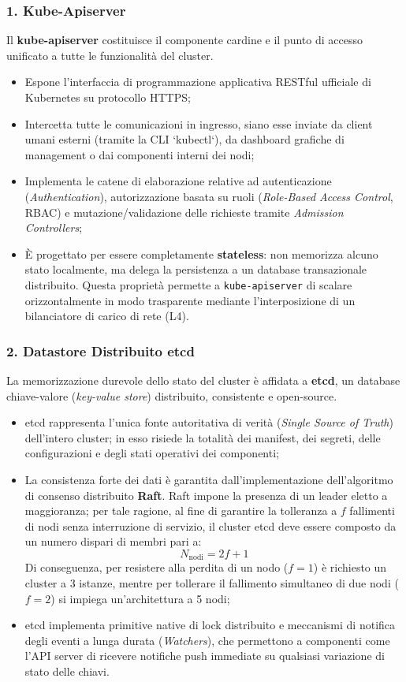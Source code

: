 \documentclass[11pt, a4paper]{article}
\begin{document}
\subsubsection{1. Kube-Apiserver}
Il \textbf{kube-apiserver} costituisce il componente cardine e il punto di accesso unificato a tutte le funzionalità del cluster.
\begin{itemize}[noitemsep]
    \item Espone l'interfaccia di programmazione applicativa RESTful ufficiale di Kubernetes su protocollo HTTPS;
    \item Intercetta tutte le comunicazioni in ingresso, siano esse inviate da client umani esterni (tramite la CLI `kubectl`), da dashboard grafiche di management o dai componenti interni dei nodi;
    \item Implementa le catene di elaborazione relative ad autenticazione (\emph{Authentication}), autorizzazione basata su ruoli (\emph{Role-Based Access Control}, RBAC) e mutazione/validazione delle richieste tramite \emph{Admission Controllers};
    \item È progettato per essere completamente \textbf{stateless}: non memorizza alcuno stato localmente, ma delega la persistenza a un database transazionale distribuito. Questa proprietà permette a \texttt{kube-apiserver} di scalare orizzontalmente in modo trasparente mediante l'interposizione di un bilanciatore di carico di rete (L4).
\end{itemize}

\subsubsection{2. Datastore Distribuito etcd}
La memorizzazione durevole dello stato del cluster è affidata a \textbf{etcd}, un database chiave-valore (\emph{key-value store}) distribuito, consistente e open-source.
\begin{itemize}[noitemsep]
    \item etcd rappresenta l'unica fonte autoritativa di verità (\emph{Single Source of Truth}) dell'intero cluster; in esso risiede la totalità dei manifest, dei segreti, delle configurazioni e degli stati operativi dei componenti;
    \item La consistenza forte dei dati è garantita dall'implementazione dell'algoritmo di consenso distribuito \textbf{Raft}. Raft impone la presenza di un leader eletto a maggioranza; per tale ragione, al fine di garantire la tolleranza a $f$ fallimenti di nodi senza interruzione di servizio, il cluster etcd deve essere composto da un numero dispari di membri pari a:
    \[
    N_{\text{nodi}} = 2f + 1
    \]
    Di conseguenza, per resistere alla perdita di un nodo ($f=1$) è richiesto un cluster a 3 istanze, mentre per tollerare il fallimento simultaneo di due nodi ($f=2$) si impiega un'architettura a 5 nodi;
    \item etcd implementa primitive native di lock distribuito e meccanismi di notifica degli eventi a lunga durata (\emph{Watchers}), che permettono a componenti come l'API server di ricevere notifiche push immediate su qualsiasi variazione di stato delle chiavi.
\end{itemize}
\end{document}
